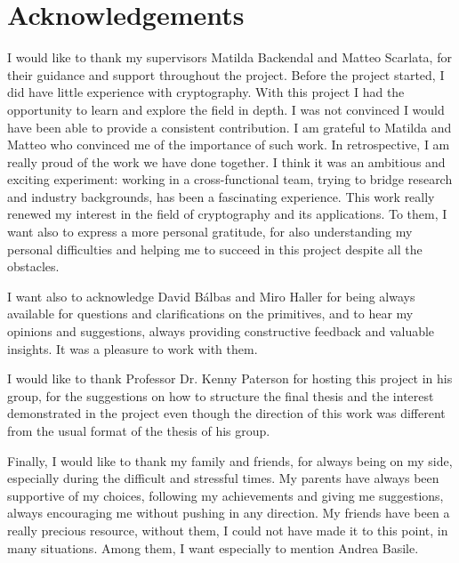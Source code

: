 \chapter*{Acknowledgements}

I would like to thank my supervisors Matilda Backendal and Matteo Scarlata,
for their guidance and support throughout the project.
Before the project started, I did have little experience with
cryptography. With this project I had the opportunity to
learn and explore the field in depth. 
I was not convinced I would have been able to provide
a consistent contribution. 
I am grateful to Matilda and Matteo who convinced me of the importance of such work.
In retrospective, I am really
proud of the work we have done together.
I think it was an ambitious and exciting experiment:
working in a cross-functional team, trying to bridge
research and industry backgrounds, 
has been a fascinating experience.
This work really renewed my interest in the field of cryptography
and its applications.
To them, I want also to express a more personal gratitude,
for also understanding my personal difficulties and
helping me to succeed in this project despite all the obstacles.

I want also to acknowledge David B{\'a}lbas and Miro Haller for 
being always available for questions and clarifications on the primitives,
and to hear my opinions and suggestions, always providing
constructive feedback and valuable insights. It was a pleasure
to work with them.

I would like to thank Professor Dr. Kenny Paterson
for hosting this project in his group, for the suggestions
on how to structure the final thesis and the interest
demonstrated in the project even though the direction
of this work was different from the usual format of the thesis
of his group.

Finally, I would like to thank my family and friends, for always
being on my side, especially during the difficult and stressful
times. My parents have always been supportive of my choices,
following my achievements and giving me suggestions, 
always encouraging me without pushing in any direction. 
My friends have been
a really precious resource, without them, I could not have
made it to this point, in many situations. Among them, I want
especially to mention Andrea Basile.
